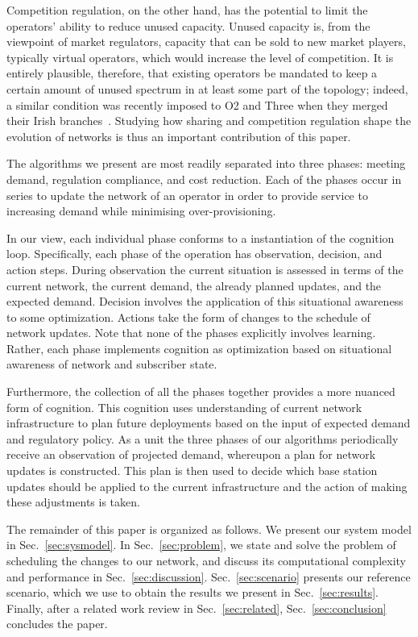 \documentclass[10pt,journal,cspaper,compsoc]{IEEEtran}
\newcommand{\Sec}[1]{Sec.~\ref{sec:#1}}
\begin{document}
Competition regulation, on the other hand, has the potential to limit the operators' ability
to reduce unused capacity.
Unused capacity is, from the viewpoint of market regulators, capacity that can be sold to new market players,
typically virtual operators, which would increase the level of competition.
It is entirely plausible, therefore, that existing operators be mandated to keep a certain amount of unused 
spectrum in at least some part of the topology; indeed, a similar condition was recently imposed to O2 and Three 
when they merged their Irish branches~\cite{vodafone-merger}.
Studying how sharing and competition regulation shape the evolution of networks is thus an important contribution 
of this paper.

The algorithms we present are most readily separated into three phases: meeting
demand, regulation compliance, and cost reduction. Each of the phases occur in
series to update the network of an operator in order to provide service to
increasing demand while minimising over-provisioning.

In our view, each individual phase conforms to a instantiation of the cognition
loop. Specifically, each phase of the operation has observation, decision, and
action steps. During observation the current situation is assessed in terms of
the current network, the current demand, the already planned updates, and the
expected demand. Decision involves the application of this situational awareness
to some optimization. Actions take the form of changes to the schedule of
network updates. Note that none of the phases explicitly involves learning.
Rather, each phase implements cognition as optimization based on situational
awareness of network and subscriber state.

Furthermore, the collection of all the phases together provides a more nuanced form of
cognition. This cognition uses understanding of current network infrastructure
to plan future deployments based on the input of expected demand and regulatory
policy. As a unit the three phases of our algorithms periodically receive an
observation of projected demand, whereupon a plan for network updates is
constructed. This plan is then used to decide which base station updates should
be applied to the current infrastructure and the action of making these
adjustments is taken.

The remainder of this paper is organized as follows. 
We present our system model in \Sec{sysmodel}.
In \Sec{problem}, we state and solve the problem of scheduling the changes to our network, and discuss its computational complexity and performance in \Sec{discussion}.
\Sec{scenario} presents our reference scenario, which we use to obtain the results we present in \Sec{results}.
Finally, after a related work review in \Sec{related}, \Sec{conclusion} concludes the paper.
\end{document}
